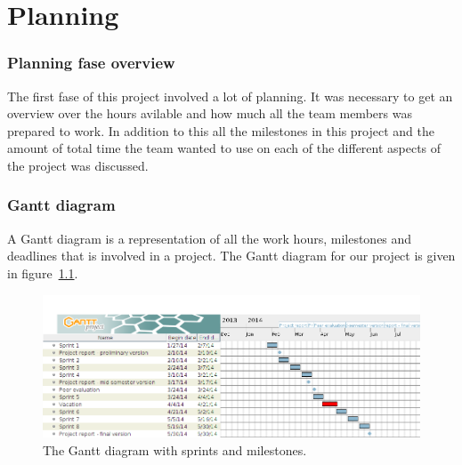 \chapter{Planning}

\subsection{Planning fase overview}
The first fase of this project involved a lot of planning. It was necessary to get an overview over the hours avilable and how much all the team members was prepared to work. In addition to this all the milestones in this project and the amount of total time the team wanted to use on each of the different aspects of the project was discussed.


\newpage


\newpage
\subsection{Gantt diagram}

A Gantt diagram is a representation of all the work hours, milestones and deadlines that is involved in a project. The Gantt diagram for our project is given in figure~\ref{fig:gantt}.

\begin{figure}[H]
\includegraphics[width=\textwidth]{ch/planning/fig/gantt.png}
\caption{The Gantt diagram with sprints and milestones.}
\label{fig:gantt}
\end{figure}






%

